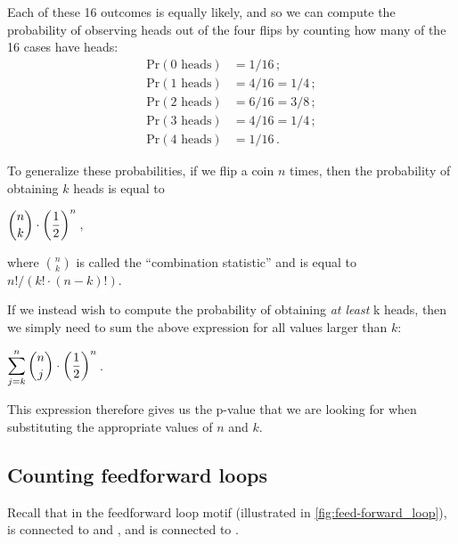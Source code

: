 \noindent Each of these 16 outcomes is equally likely, and so we can compute the probability of observing  heads out of the four flips by counting how many of the 16 cases have  heads:
\begin{align*}
\mathrm{Pr}(\text{0 heads}) &= 1/16\,;\\
\mathrm{Pr}(\text{1 heads}) & = 4/16 = 1/4\,;\\
\mathrm{Pr}(\text{2 heads}) & = 6/16 = 3/8\,;\\
\mathrm{Pr}(\text{3 heads}) & = 4/16 = 1/4\,;\\
\mathrm{Pr}(\text{4 heads}) & = 1/16\,.
\end{align*}

To generalize these probabilities, if we flip a coin $n$ times, then the probability of obtaining $k$ heads is equal to 

\begin{center}
$\dbinom{n}{k} \cdot \left(\dfrac{1}{2}\right)^n$\,,
\end{center}

\noindent where $\binom{n}{k}$ is called the ``combination statistic'' and is equal to $n!/(k! \cdot (n-k)!)$.

If we instead wish to compute the probability of obtaining \textit{at least} k heads, then we simply need to sum the above expression for all values larger than $k$:

\begin{center}
$\displaystyle\sum\limits_{j=k}^n{\dbinom{n}{j} \cdot \left(\dfrac{1}{2}\right)^n}$\,.
\end{center}

\noindent This expression therefore gives us the p-value that we are looking for when substituting the appropriate values of $n$ and $k$.\\

\begin{exercise}[%
When $n = 130$ and $k = 95$, compute the p-value given by the above expression. Is it likely that random chance could have produced 95 out of 130 loops in the transcription factor network that correspond to repression?
]\end{exercise}

\subsection{Counting feedforward loops}

Recall that in the feedforward loop motif (illustrated in \autoref{fig:feed-forward_loop}),  is connected to  and , and  is connected to .\\

